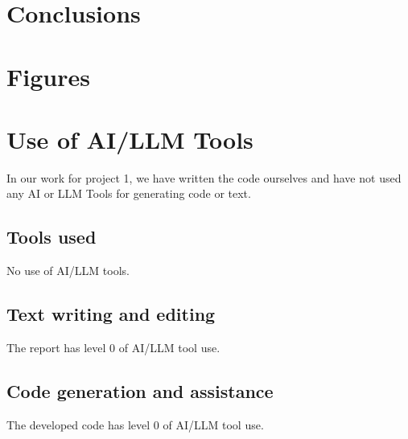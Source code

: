 \documentclass[english,notitlepage,reprint,nofootinbib]{revtex4-2}  %
\begin{document}
\section{Conclusions}\label{sec:conclusions}


\section{Figures}\label{sec:figures}





\onecolumngrid



\newpage
\appendix
\section{Use of AI/LLM Tools}
In our work for project 1, we have written the code ourselves and have not used any AI or LLM Tools for generating code or text. 
\subsection{Tools used}
No use of AI/LLM tools.
\subsection{Text writing and editing}
The report has level 0 of AI/LLM tool use.
\subsection{Code generation and assistance}
The developed code has level 0 of AI/LLM tool use.
\end{document}
